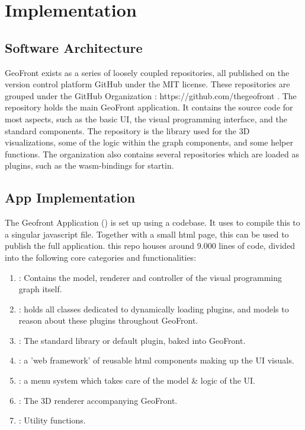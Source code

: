 \chapter{Implementation}%

\section{Software Architecture}
GeoFront exists as a series of loosely coupled repositories, all published on the version control platform GitHub under the MIT license. These repositories are grouped under the GitHub Organization  : https://github.com/thegeofront .
The  repository holds the main GeoFront application. It contains the source code for most aspects, such as the basic UI, the visual programming interface, and the standard components. 
The  repository is the library used for the 3D visualizations, some of the logic within the graph components, and some helper functions.
The  organization also contains several repositories which are loaded as plugins, such as the wasm-bindings for startin.

\section{App Implementation}
The Geofront Application () is set up using a  codebase. It uses  to compile this to a singular javascript file. Together with a small html page, this can be used to publish the full application. 
this repo houses around 9.000 lines of code, divided into the following core categories and functionalities:
\begin{enumerate}[I]
  \item {}: Contains the model, renderer and controller of the visual programming graph itself.  
  \item {}: holds all classes dedicated to dynamically loading plugins, and  models to reason about these plugins throughout GeoFront.
  \item {}: The standard library or default plugin, baked into GeoFront.   
  \item {}: a 'web framework' of reusable html components making up the UI visuals.
  \item {}: a menu system which takes care of the model \& logic of the UI.
  \item {}: The 3D renderer accompanying GeoFront.
  \item {}: Utility functions.   
\end{enumerate}

